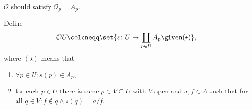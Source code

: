 $\mathcal{O}$ should satisfy $\mathcal{O}_p = A_p$.

Define
\[ \mathcal{O}U \coloneqq\set{s\colon U\to\coprod_{p \in U} A_p\given (\star)}, \]
where $(\star)$ means that
\begin{enumerate}
	\item $\forall p \in U\colon s(p) \in A_p$,
	\item for each $p \in U$ there is some $p \in V \subseteq U$ with $V$ open and
		$a, f \in A$ such that for all $q \in V\colon f\notin q\wedge s(q) = a/f$.
\end{enumerate}
